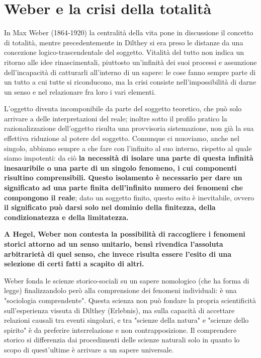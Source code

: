 \section{Weber e la crisi della totalità}

In Max Weber (1864-1920) la centralità della vita pone in discussione il concetto di totalità, mentre precedentemente in Dilthey si era preso le distanze da una concezione logico-trascendentale del soggetto. Vitalità del tutto non indica un ritorno alle idee rinascimentali, piuttosto un'infinità dei suoi processi e assunzione dell'incapacità di catturarli all'interno di un sapere: le cose fanno sempre  parte di un tutto a cui tutte si riconducono, ma la crisi consiste nell'impossibilità di darne un senso e nel relazionare fra loro i vari elementi.

L'oggetto diventa incomponibile da parte del soggetto teoretico, che può solo arrivare a delle interpretazioni del reale; inoltre sotto il profilo pratico la razionalizzazione dell'oggetto risulta una provvisoria sistemazione, non già la sua effettiva riduzione al potere del soggetto. Comunque ci muoviamo, anche nel singolo, abbiamo sempre a che fare con l'infinito al suo interno, rispetto al quale siamo impotenti: da ciò \textbf{la necessità di isolare una parte di questa infinità inesauribile o una parte di un singolo fenomeno, i cui componenti risultino comprensibili. Questo isolamento è necessario per dare un significato ad una parte finita dell'infinito numero dei fenomeni che compongono il reale}; dato un soggetto finito, questo esito è inevitabile, ovvero \textbf{il significato può darsi solo nel dominio della finitezza, della condizionatezza e della limitatezza.}

\textbf{A Hegel, Weber non contesta la possibilità di raccogliere i fenomeni storici attorno ad un senso unitario, bensì rivendica l'assoluta arbitrarietà di quel senso, che invece risulta essere l'esito di una selezione di certi fatti a scapito di altri.}

Weber fonda le scienze storico-sociali su un sapere nomologico (che ha forma di legge) finalizzandolo  però alla comprensione dei fenomeni individuali: è una "sociologia comprendente". Questa scienza non può fondare la propria scientificità sull'esperienza vissuta di Dilthey (Erlebnis), ma sulla capacità di accettare relazioni causali tra eventi singolari, e tra "scienze della natura" e "scienze dello spirito" è da preferire interrelazione e non contrapposizione. Il comprendere storico si differenzia dai procedimenti delle scienze naturali solo in quanto lo scopo di quest'ultime è arrivare a un sapere universale.

